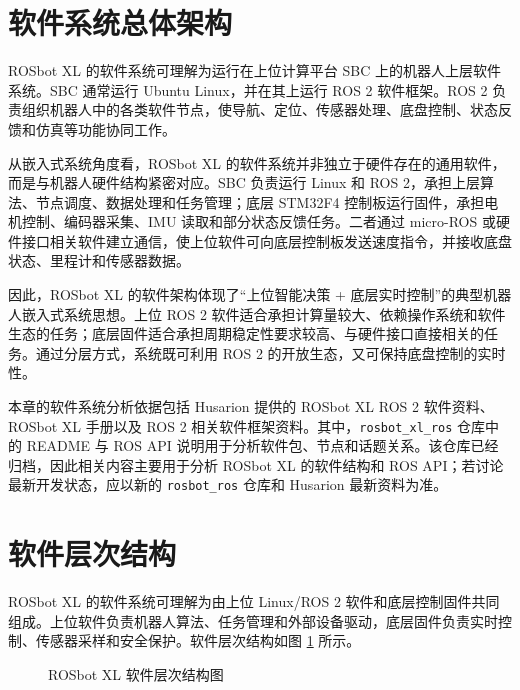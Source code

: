 \documentclass[UTF8,a4paper,12pt]{ctexrep}
\begin{document}
\section{软件系统总体架构}

ROSbot XL 的软件系统可理解为运行在上位计算平台 SBC 上的机器人上层软件系统。SBC 通常运行 Ubuntu Linux，并在其上运行 ROS 2 软件框架。ROS 2 负责组织机器人中的各类软件节点，使导航、定位、传感器处理、底盘控制、状态反馈和仿真等功能协同工作。

从嵌入式系统角度看，ROSbot XL 的软件系统并非独立于硬件存在的通用软件，而是与机器人硬件结构紧密对应。SBC 负责运行 Linux 和 ROS 2，承担上层算法、节点调度、数据处理和任务管理；底层 STM32F4 控制板运行固件，承担电机控制、编码器采集、IMU 读取和部分状态反馈任务。二者通过 micro-ROS 或硬件接口相关软件建立通信，使上位软件可向底层控制板发送速度指令，并接收底盘状态、里程计和传感器数据。

因此，ROSbot XL 的软件架构体现了“上位智能决策 + 底层实时控制”的典型机器人嵌入式系统思想。上位 ROS 2 软件适合承担计算量较大、依赖操作系统和软件生态的任务；底层固件适合承担周期稳定性要求较高、与硬件接口直接相关的任务。通过分层方式，系统既可利用 ROS 2 的开放生态，又可保持底盘控制的实时性。

本章的软件系统分析依据包括 Husarion 提供的 ROSbot XL ROS 2 软件资料、ROSbot XL 手册以及 ROS 2 相关软件框架资料。其中，\texttt{rosbot\_xl\_ros} 仓库中的 README 与 ROS API 说明用于分析软件包、节点和话题关系。该仓库已经归档，因此相关内容主要用于分析 ROSbot XL 的软件结构和 ROS API；若讨论最新开发状态，应以新的 \texttt{rosbot\_ros} 仓库和 Husarion 最新资料为准。

\section{软件层次结构}

ROSbot XL 的软件系统可理解为由上位 Linux/ROS 2 软件和底层控制固件共同组成。上位软件负责机器人算法、任务管理和外部设备驱动，底层固件负责实时控制、传感器采样和安全保护。软件层次结构如图 \ref{fig:software-layer} 所示。

\begin{figure}[H]
  \centering
  \caption{ROSbot XL 软件层次结构图}
  \label{fig:software-layer}
\end{figure}
\end{document}
